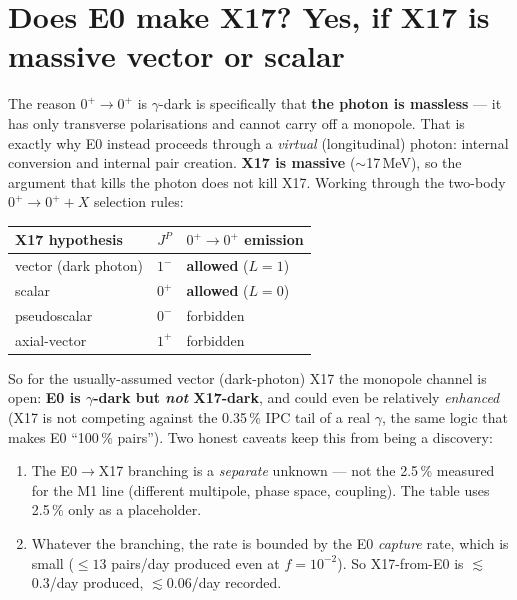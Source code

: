 \documentclass[11pt,a4paper]{article}
\begin{document}
\section{Does E0 make X17? Yes, if X17 is massive vector or scalar}

The reason $0^+\!\to0^+$ is $\gamma$-dark is specifically that \textbf{the photon
is massless} --- it has only transverse polarisations and cannot carry off a
monopole. That is exactly why E0 instead proceeds through a \emph{virtual}
(longitudinal) photon: internal conversion and internal pair creation. \textbf{X17
is massive} ($\sim$17\,MeV), so the argument that kills the photon does not kill
X17. Working through the two-body $0^+\!\to0^++X$ selection rules:

\begin{center}
\renewcommand{\arraystretch}{1.15}
\begin{tabular}{lcl}
\hline
X17 hypothesis & $J^P$ & $0^+\!\to0^+$ emission \\
\hline
vector (dark photon) & $1^-$ & \textbf{allowed} ($L=1$) \\
scalar               & $0^+$ & \textbf{allowed} ($L=0$) \\
pseudoscalar         & $0^-$ & forbidden \\
axial-vector         & $1^+$ & forbidden \\
\hline
\end{tabular}
\end{center}

\noindent So for the usually-assumed vector (dark-photon) X17 the monopole
channel is open: \textbf{E0 is $\gamma$-dark but \emph{not} X17-dark}, and could
even be relatively \emph{enhanced} (X17 is not competing against the 0.35\,\%
IPC tail of a real $\gamma$, the same logic that makes E0 ``100\,\% pairs'').
Two honest caveats keep this from being a discovery:
\begin{enumerate}\setlength\itemsep{1pt}
  \item The E0$\to$X17 branching is a \emph{separate} unknown --- not the
    2.5\,\% measured for the M1 line (different multipole, phase space,
    coupling). The table uses 2.5\,\% only as a placeholder.
  \item Whatever the branching, the rate is bounded by the E0 \emph{capture}
    rate, which is small ($\le13$ pairs/day produced even at $f=10^{-2}$). So
    X17-from-E0 is $\lesssim$0.3/day produced, $\lesssim$0.06/day recorded.
\end{enumerate}
\end{document}
